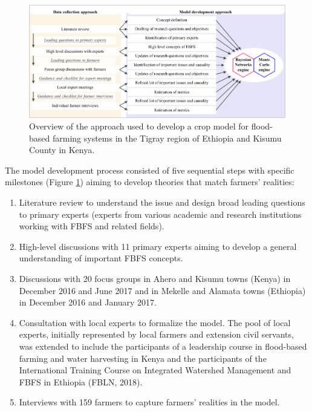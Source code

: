 \documentclass[]{elsarticle} %
\begin{document}
\begin{figure}[!h]

{\centering \includegraphics[width=1\linewidth,]{figures/fig2-plot-1} 

}

\caption{Overview of the approach used to develop a crop model for flood-based farming systems in the Tigray region of Ethiopia and Kisumu County in Kenya.}\label{fig:fig2}
\end{figure}

The model development process consisted of five sequential steps with specific milestones (Figure \ref{fig:fig2}) aiming to develop theories that match farmers' realities:

\begin{enumerate}
\def\labelenumi{\arabic{enumi}.}
\item
  Literature review to understand the issue and design broad leading questions to primary experts (experts from various academic and research institutions working with FBFS and related fields).
\item
  High-level discussions with 11 primary experts aiming to develop a general understanding of important FBFS concepts.
\item
  Discussions with 20 focus groups in Ahero and Kisumu towns (Kenya) in December 2016 and June 2017 and in Mekelle and Alamata towns (Ethiopia) in December 2016 and January 2017.
\item
  Consultation with local experts to formalize the model. The pool of local experts, initially represented by local farmers and extension civil servants, was extended to include the participants of a leadership course in flood-based farming and water harvesting in Kenya and the participants of the International Training Course on Integrated Watershed Management and FBFS in Ethiopia (FBLN, 2018).
\item
  Interviews with 159 farmers to capture farmers' realities in the model.
\end{enumerate}
\end{document}
